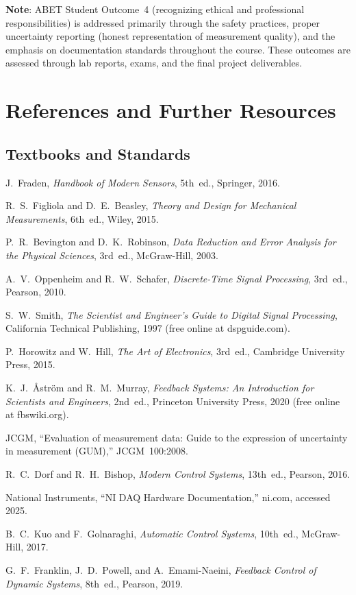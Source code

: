 \documentclass[11pt,letterpaper,twoside,openany]{book}
\begin{document}
\textbf{Note}: ABET Student Outcome~4 (recognizing ethical and professional responsibilities) is addressed primarily through the safety practices, proper uncertainty reporting (honest representation of measurement quality), and the emphasis on documentation standards throughout the course. These outcomes are assessed through lab reports, exams, and the final project deliverables.

\chapter*{References and Further Resources}

\section*{Textbooks and Standards}

\begin{enumerate}[label={[\arabic*]},leftmargin=2em]
\item J.~Fraden, \emph{Handbook of Modern Sensors}, 5th~ed., Springer, 2016.
\item R.~S.~Figliola and D.~E.~Beasley, \emph{Theory and Design for Mechanical Measurements}, 6th~ed., Wiley, 2015.
\item P.~R.~Bevington and D.~K.~Robinson, \emph{Data Reduction and Error Analysis for the Physical Sciences}, 3rd~ed., McGraw-Hill, 2003.
\item A.~V.~Oppenheim and R.~W.~Schafer, \emph{Discrete-Time Signal Processing}, 3rd~ed., Pearson, 2010.
\item S.~W.~Smith, \emph{The Scientist and Engineer's Guide to Digital Signal Processing}, California Technical Publishing, 1997 (free online at dspguide.com).
\item P.~Horowitz and W.~Hill, \emph{The Art of Electronics}, 3rd~ed., Cambridge University Press, 2015.
\item K.~J.~\r{A}str\"{o}m and R.~M.~Murray, \emph{Feedback Systems: An Introduction for Scientists and Engineers}, 2nd~ed., Princeton University Press, 2020 (free online at fbswiki.org).
\item JCGM, ``Evaluation of measurement data: Guide to the expression of uncertainty in measurement (GUM),'' JCGM~100:2008.
\item R.~C.~Dorf and R.~H.~Bishop, \emph{Modern Control Systems}, 13th~ed., Pearson, 2016.
\item National Instruments, ``NI DAQ Hardware Documentation,'' ni.com, accessed 2025.
\item B.~C.~Kuo and F.~Golnaraghi, \emph{Automatic Control Systems}, 10th~ed., McGraw-Hill, 2017.
\item G.~F.~Franklin, J.~D.~Powell, and A.~Emami-Naeini, \emph{Feedback Control of Dynamic Systems}, 8th~ed., Pearson, 2019.
\end{enumerate}
\end{document}
